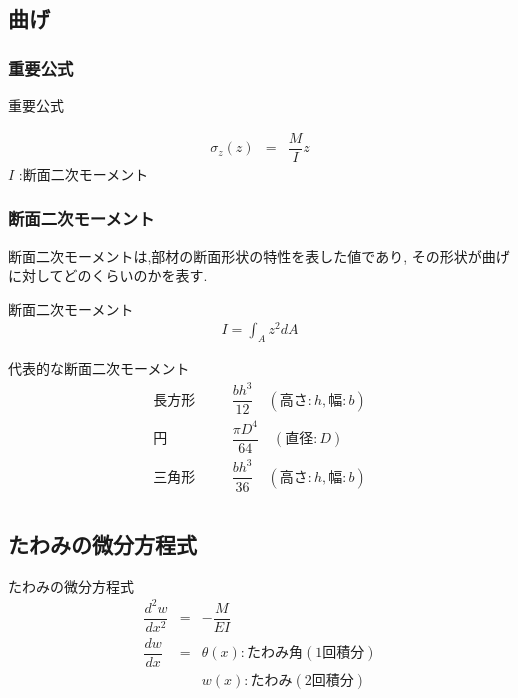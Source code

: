 \documentclass[a4paper]{jsarticle}
\begin{document}
\subsection{曲げ}
\subsubsection{重要公式}
\begin{itembox}[l]{重要公式}
    \begin{center}
        \begin{eqnarray*}
            \sigma_z\left(z\right)&=&\dfrac{M}{I}z
        \end{eqnarray*}
        $I$ :断面二次モーメント
    \end{center}
\end{itembox}
\subsubsection{断面二次モーメント}
断面二次モーメントは,部材の断面形状の特性を表した値であり,
その形状が曲げに対してどのくらいのかを表す.
\begin{itembox}[l]{断面二次モーメント}
    \begin{eqnarray*}
        \displaystyle I=\int_Az^2dA
    \end{eqnarray*}
\end{itembox}
\begin{itembox}[l]{代表的な断面二次モーメント}
    \begin{eqnarray*}
        長方形\quad&&\dfrac{bh^3}{12}\quad(高さ:h,幅:b)\\
        円\qquad&&\dfrac{\pi D^4}{64}\quad(直径:D)\\
        三角形\quad&&\dfrac{bh^3}{36}\quad(高さ:h,幅:b)\\
    \end{eqnarray*}
\end{itembox}
\subsection{たわみの微分方程式}
\begin{itembox}[l]{たわみの微分方程式}
    \begin{eqnarray*}
        \dfrac{d^2w}{dx^2}&=&-\dfrac{M}{EI}\\
        \dfrac{dw}{dx}&=&\theta\left(x\right):たわみ角 (1回積分)\\
        &&w\left(x\right):たわみ(2回積分)
    \end{eqnarray*}
\end{itembox}
\end{document}
